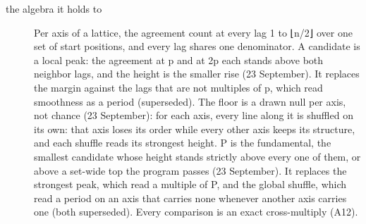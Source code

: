 \begin{description}
\item[{the algebra it holds to}] Per axis of a lattice, the agreement count at every lag 1 to ⌊n/2⌋ over one set of start positions, and every lag shares one denominator. A candidate is a local peak: the agreement at p and at 2p each stands above both neighbor lags, and the height is the smaller rise (23 September). It replaces the margin against the lags that are not multiples of p, which read smoothness as a period (superseded). The floor is a drawn null per axis, not chance (23 September): for each axis, every line along it is shuffled on its own: that axis loses its order while every other axis keeps its structure, and each shuffle reads its strongest height. P is the fundamental, the smallest candidate whose height stands strictly above every one of them, or above a set-wide top the program passes (23 September). It replaces the strongest peak, which read a multiple of P, and the global shuffle, which read a period on an axis that carries none whenever another axis carries one (both superseded). Every comparison is an exact cross-multiply (A12).

\end{description}
